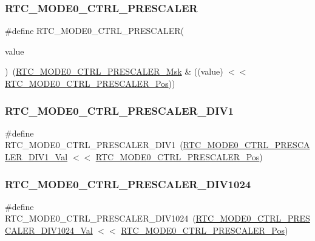 \subsubsection{\texorpdfstring{RTC\_MODE0\_CTRL\_PRESCALER}{RTC\_MODE0\_CTRL\_PRESCALER}}
{\footnotesize\ttfamily \#define R\+T\+C\+\_\+\+M\+O\+D\+E0\+\_\+\+C\+T\+R\+L\+\_\+\+P\+R\+E\+S\+C\+A\+L\+ER(\begin{DoxyParamCaption}\item[{}]{value }\end{DoxyParamCaption})~(\mbox{\hyperlink{group___s_a_m_d21___r_t_c_gab795c61438e1a1b21c718cb0db90d836}{R\+T\+C\+\_\+\+M\+O\+D\+E0\+\_\+\+C\+T\+R\+L\+\_\+\+P\+R\+E\+S\+C\+A\+L\+E\+R\+\_\+\+Msk}} \& ((value) $<$$<$ \mbox{\hyperlink{group___s_a_m_d21___r_t_c_gae6a98daefadfa386b8f37022a707044e}{R\+T\+C\+\_\+\+M\+O\+D\+E0\+\_\+\+C\+T\+R\+L\+\_\+\+P\+R\+E\+S\+C\+A\+L\+E\+R\+\_\+\+Pos}}))}

\mbox{\label{group___s_a_m_d21___r_t_c_ga027b0b7d026a8884c19e6e89aba663f1}} 
\subsubsection{\texorpdfstring{RTC\_MODE0\_CTRL\_PRESCALER\_DIV1}{RTC\_MODE0\_CTRL\_PRESCALER\_DIV1}}
{\footnotesize\ttfamily \#define R\+T\+C\+\_\+\+M\+O\+D\+E0\+\_\+\+C\+T\+R\+L\+\_\+\+P\+R\+E\+S\+C\+A\+L\+E\+R\+\_\+\+D\+I\+V1~(\mbox{\hyperlink{group___s_a_m_d21___r_t_c_gab83b5689ebf22a3732d6b26604849711}{R\+T\+C\+\_\+\+M\+O\+D\+E0\+\_\+\+C\+T\+R\+L\+\_\+\+P\+R\+E\+S\+C\+A\+L\+E\+R\+\_\+\+D\+I\+V1\+\_\+\+Val}} $<$$<$ \mbox{\hyperlink{group___s_a_m_d21___r_t_c_gae6a98daefadfa386b8f37022a707044e}{R\+T\+C\+\_\+\+M\+O\+D\+E0\+\_\+\+C\+T\+R\+L\+\_\+\+P\+R\+E\+S\+C\+A\+L\+E\+R\+\_\+\+Pos}})}

\mbox{\label{group___s_a_m_d21___r_t_c_ga9ba30717126d6fb274566163fc08307a}} 
\subsubsection{\texorpdfstring{RTC\_MODE0\_CTRL\_PRESCALER\_DIV1024}{RTC\_MODE0\_CTRL\_PRESCALER\_DIV1024}}
{\footnotesize\ttfamily \#define R\+T\+C\+\_\+\+M\+O\+D\+E0\+\_\+\+C\+T\+R\+L\+\_\+\+P\+R\+E\+S\+C\+A\+L\+E\+R\+\_\+\+D\+I\+V1024~(\mbox{\hyperlink{group___s_a_m_d21___r_t_c_ga50662d4b719aae47265b92a794c586ab}{R\+T\+C\+\_\+\+M\+O\+D\+E0\+\_\+\+C\+T\+R\+L\+\_\+\+P\+R\+E\+S\+C\+A\+L\+E\+R\+\_\+\+D\+I\+V1024\+\_\+\+Val}} $<$$<$ \mbox{\hyperlink{group___s_a_m_d21___r_t_c_gae6a98daefadfa386b8f37022a707044e}{R\+T\+C\+\_\+\+M\+O\+D\+E0\+\_\+\+C\+T\+R\+L\+\_\+\+P\+R\+E\+S\+C\+A\+L\+E\+R\+\_\+\+Pos}})}

